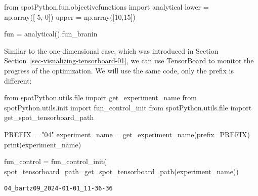 \documentclass[
  letterpaper,
  DIV=11,
  numbers=noendperiod]{scrreprt}
\newenvironment{Shaded}{\begin{snugshade}}{\end{snugshade}}
\newcommand{\BuiltInTok}[1]{\textcolor[rgb]{0.00,0.23,0.31}{#1}}
\newcommand{\DecValTok}[1]{\textcolor[rgb]{0.68,0.00,0.00}{#1}}
\newcommand{\ImportTok}[1]{\textcolor[rgb]{0.00,0.46,0.62}{#1}}
\newcommand{\NormalTok}[1]{\textcolor[rgb]{0.00,0.23,0.31}{#1}}
\newcommand{\OperatorTok}[1]{\textcolor[rgb]{0.37,0.37,0.37}{#1}}
\newcommand{\StringTok}[1]{\textcolor[rgb]{0.13,0.47,0.30}{#1}}
\begin{document}
\begin{Shaded}
\begin{Highlighting}[]
\ImportTok{from}\NormalTok{ spotPython.fun.objectivefunctions }\ImportTok{import}\NormalTok{ analytical}
\NormalTok{lower }\OperatorTok{=}\NormalTok{ np.array([}\OperatorTok{{-}}\DecValTok{5}\NormalTok{,}\OperatorTok{{-}}\DecValTok{0}\NormalTok{])}
\NormalTok{upper }\OperatorTok{=}\NormalTok{ np.array([}\DecValTok{10}\NormalTok{,}\DecValTok{15}\NormalTok{])}
\end{Highlighting}
\end{Shaded}

\begin{Shaded}
\begin{Highlighting}[]
\NormalTok{fun }\OperatorTok{=}\NormalTok{ analytical().fun\_branin}
\end{Highlighting}
\end{Shaded}

\begin{tcolorbox}[enhanced jigsaw, opacityback=0, left=2mm, title=\textcolor{quarto-callout-note-color}{\faInfo}\hspace{0.5em}{TensorBoard}, bottomrule=.15mm, titlerule=0mm, arc=.35mm, leftrule=.75mm, colbacktitle=quarto-callout-note-color!10!white, bottomtitle=1mm, opacitybacktitle=0.6, coltitle=black, colframe=quarto-callout-note-color-frame, toprule=.15mm, breakable, colback=white, toptitle=1mm, rightrule=.15mm]

Similar to the one-dimensional case, which was introduced in Section
Section~\ref{sec-visualizing-tensorboard-01}, we can use TensorBoard to
monitor the progress of the optimization. We will use the same code,
only the prefix is different:

\begin{Shaded}
\begin{Highlighting}[]
\ImportTok{from}\NormalTok{ spotPython.utils.}\BuiltInTok{file} \ImportTok{import}\NormalTok{ get\_experiment\_name}
\ImportTok{from}\NormalTok{ spotPython.utils.init }\ImportTok{import}\NormalTok{ fun\_control\_init}
\ImportTok{from}\NormalTok{ spotPython.utils.}\BuiltInTok{file} \ImportTok{import}\NormalTok{ get\_spot\_tensorboard\_path}

\NormalTok{PREFIX }\OperatorTok{=} \StringTok{"04"}
\NormalTok{experiment\_name }\OperatorTok{=}\NormalTok{ get\_experiment\_name(prefix}\OperatorTok{=}\NormalTok{PREFIX)}
\BuiltInTok{print}\NormalTok{(experiment\_name)}

\NormalTok{fun\_control }\OperatorTok{=}\NormalTok{ fun\_control\_init(}
\NormalTok{    spot\_tensorboard\_path}\OperatorTok{=}\NormalTok{get\_spot\_tensorboard\_path(experiment\_name))}
\end{Highlighting}
\end{Shaded}

\begin{verbatim}
04_bartz09_2024-01-01_11-36-36
\end{verbatim}

\end{tcolorbox}
\end{document}
